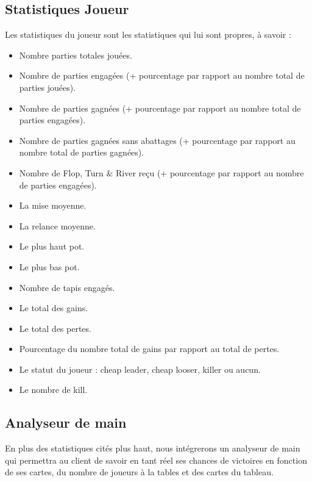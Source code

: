 \subsection{Statistiques Joueur}

Les statistiques du joueur sont les statistiques qui lui sont propres, à savoir :

\begin{itemize}
	\item Nombre parties totales jouées.
	\item Nombre de parties engagées (+ pourcentage par rapport au nombre total
	     de parties jouées).
	\item Nombre de parties gagnées (+ pourcentage par rapport au nombre total
	     de parties engagées).
	\item Nombre de parties gagnées sans abattages (+ pourcentage par rapport au
	     nombre total de parties gagnées).
	\item Nombre de Flop, Turn \& River reçu (+ pourcentage par rapport au 
	      nombre de parties engagées).  
	\item La mise moyenne.
	\item La relance moyenne.
	\item Le plus haut pot.
	\item Le plus bas pot.
	\item Nombre de tapis engagés.
	\item Le total des gains.
	\item Le total des pertes.
	\item Pourcentage du nombre total de gains par rapport au total de pertes.
	\item Le statut du joueur : cheap leader, cheap looser, killer ou aucun.
	\item Le nombre de kill.
\end{itemize}

\subsection{Analyseur de main}

En plus des statistiques cités plus haut, nous intégrerons un analyseur de main 
qui permettra au client de savoir en tant réel ses chances de victoires en fonction
 de ses cartes, du nombre de joueurs à la tables et des cartes du tableau. 
